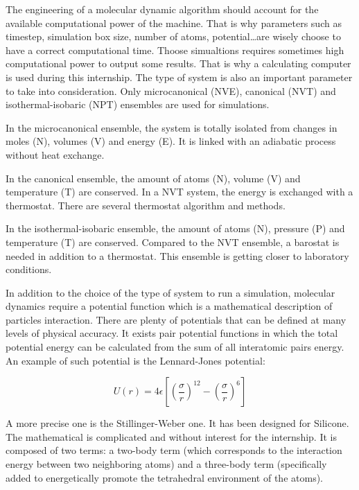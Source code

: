             The engineering of a \gls{molecular dynamic} algorithm should account for the available computational power of the machine. That is why parameters such as timestep, simulation box size, number of atoms, potential\dots are wisely choose to have a correct computational time. Thoose simualtions requires sometimes high computational power to output some results. That is why a calculating computer is used during this internship. The type of system is also an important parameter to take into consideration. Only microcanonical (\gls{NVE}), canonical (\gls{NVT}) and isothermal-isobaric (\gls{NPT}) ensembles are used for simulations. 

            In the microcanonical ensemble, the system is totally isolated from changes in moles (N), volumes (V) and energy (E). It is linked with an \gls{adiabatic} process without heat exchange. 

            In the canonical ensemble, the amount of atoms (N), volume (V) and temperature (T) are conserved. In a \gls{NVT} system, the energy is exchanged with a thermostat. There are several thermostat algorithm and methods. 

            In the isothermal-isobaric ensemble, the amount of atoms (N), pressure (P) and temperature (T) are conserved. Compared to the \gls{NVT} ensemble, a barostat is needed in addition to a thermostat. This ensemble is getting closer to laboratory conditions. \medskip

            In addition to the choice of the type of system to run a simulation, \glspl{molecular dynamic} require a potential function which is a mathematical description of particles interaction. There are plenty of potentials that can be defined at many levels of physical accuracy. It exists pair potential functions in which the total potential energy can be calculated from the sum of all interatomic pairs energy. An example of such potential is the Lennard-Jones potential: 

            $$
            U(r) = 4\epsilon \left[\left(\frac{\sigma}{r}\right)^{12} - \left(\frac{\sigma}{r}\right)^6\right]
            $$
            \smallskip

            A more precise one is the Stillinger-Weber one. It has been designed for Silicone. The mathematical is complicated and without interest for the internship. It is composed of two terms: a two-body term (which corresponds to the interaction energy between two neighboring atoms) and a three-body term (specifically added to energetically promote the tetrahedral environment of the atoms).

